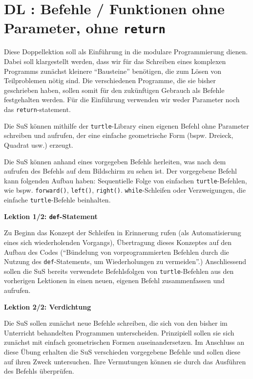 \section{DL \themycounter: Befehle / Funktionen ohne Parameter, ohne \texorpdfstring{\lstinline|return|}{return}}
\begin{myExBox}[title=DL \themycounter]
Diese Doppellektion soll als Einführung in die modulare Programmierung dienen. Dabei soll klargestellt werden, dass wir für das Schreiben eines komplexen Programms zunächst kleinere ``Bausteine'' benötigen, die zum Lösen von Teilproblemen nötig sind. Die verschiedenen Programme, die sie bisher geschrieben haben, sollen somit für den zukünftigen Gebrauch als Befehle festgehalten werden. Für die Einführung verwenden wir weder Parameter noch das \lstinline|return|-statement.

\begin{todolist}
    \item Die SuS können mithilfe der \lstinline|turtle|-Library einen eigenen Befehl ohne Parameter schreiben und aufrufen, der eine einfache geometrische Form (bspw. Dreieck, Quadrat usw.) erzeugt.
    \item Die SuS können anhand eines vorgegeben Befehls herleiten, was nach dem aufrufen des Befehls auf dem Bildschirm zu sehen ist. Der vorgegebene Befehl kann folgenden Aufbau haben: Sequentielle Folge von einfachen \lstinline|turtle|-Befehlen, wie bspw. \lstinline|forward()|, \lstinline|left()|, \lstinline|right()|. \lstinline|while|-Schleifen oder Verzweigungen, die einfache \lstinline|turtle|-Befehle beinhalten.
\end{todolist}

\textbf{Lektion 1/2:  \lstinline|def|-Statement}

Zu Beginn das Konzept der Schleifen in Erinnerung rufen (als Automatisierung eines sich wiederholenden Vorgangs), Übertragung dieses Konzeptes auf den Aufbau des Codes (``Bündelung von vorprogrammierten Befehlen durch die Nutzung des \lstinline|def|-Statements, um Wiederholungen zu vermeiden''.) Anschliessend sollen die SuS bereits verwendete Befehlsfolgen von \lstinline|turtle|-Befehlen aus den vorherigen Lektionen in einen neuen, eigenen Befehl zusammenfassen und aufrufen. 

\textbf{Lektion 2/2: Verdichtung}

Die SuS sollen zunächst neue Befehle schreiben, die sich von den bisher im Unterricht behandelten Programmen unterscheiden. Prinzipiell sollen sie sich zunächst mit einfach geometrischen Formen auseinandersetzen. Im Anschluss an diese Übung erhalten die SuS verschieden vorgegebene Befehle und sollen diese auf ihren Zweck untersuchen. Ihre Vermutungen können sie durch das Ausführen des Befehls überprüfen.


\end{myExBox}
